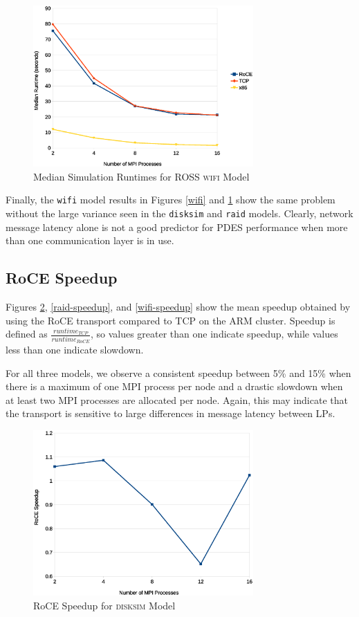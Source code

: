 \documentclass[11pt]{book}
\begin{document}
\begin{figure}
\centering
\includegraphics[width=0.75\textwidth]{wifi_median}
\caption{Median Simulation Runtimes for ROSS \textsc{wifi} Model}
\label{wifi-median}
\end{figure}

Finally, the \verb;wifi; model results in Figures \ref{wifi} and \ref{wifi-median} show
the same problem without the large variance seen in the \verb;disksim; and \verb;raid;
models.  Clearly, network message latency alone is not a good predictor for PDES
performance when more than one communication layer is in use.


\subsection{RoCE Speedup}

Figures \ref{disksim-speedup}, \ref{raid-speedup}, and \ref{wifi-speedup} show the mean
speedup obtained by using the RoCE transport compared to TCP on the ARM cluster.  Speedup
is defined as $\frac{runtime_{TCP}}{runtime_{RoCE}}$, so values greater than one indicate
speedup, while values less than one indicate slowdown.

For all three models, we observe a consistent speedup between 5\% and 15\% when there is a
maximum of one MPI process per node and a drastic slowdown when at least two MPI processes
are allocated per node.  Again, this may indicate that the transport is sensitive to large
differences in message latency between LPs.

\begin{figure}
\centering
\includegraphics[width=0.75\textwidth]{disksim_speedup}
\caption{RoCE Speedup for \textsc{disksim} Model}\label{disksim-speedup}
\end{figure}
\end{document}
